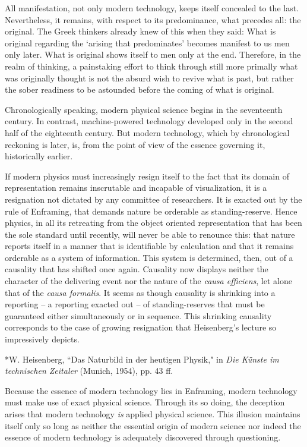 \documentclass[12pt]{article}
\begin{document}
All manifestation, not only modern technology, keeps itself concealed to the last. Nevertheless, it remains, with respect to its predominance, what precedes all: the original. The Greek thinkers already knew of this when they said: What is original regarding the `arising that predominates' becomes manifest to us men only later. What is original shows itself to men only at the end. Therefore, in the realm of thinking, a painstaking effort to think through still more primally what was originally thought is not the absurd wish to revive what is past, but rather the sober readiness to be astounded before the coming of what is original.

Chronologically speaking, modern physical science begins in the seventeenth century. In contrast, machine-powered technology developed only in the second half of the eighteenth century. But modern technology, which by chronological reckoning is later, is, from the point of view of the essence governing it, historically earlier.

If modern physics must increasingly resign itself to the fact that its domain of representation remains inscrutable and incapable of visualization, it is a resignation not dictated by any committee of researchers. It is exacted out by the rule of Enframing, that demands nature be orderable as standing-reserve. Hence physics, in all its retreating from the object oriented representation that has been the sole standard until recently, will never be able to renounce this: that nature reports itself in a manner that is identifiable by calculation and that it remains orderable as a system of information. This system is determined, then, out of a causality that has shifted once again. Causality now displays neither the character of the delivering event nor the nature of the \textit{causa efficiens}, let alone that of the \textit{causa formalis}. It seems as though causality is shrinking into a reporting -- a reporting exacted out -- of standing-reserves that must be guaranteed either simultaneously or in sequence.  This shrinking causality corresponds to the case of growing resignation that Heisenberg's lecture so impressively depicts.

*W. Heisenberg, ``Das Naturbild in der heutigen Physik," in \textit{Die K{\"u}nste im technischen Zeitaler} (Munich, 1954), pp. 43 ff.

Because the essence of modern technology lies in Enframing, modern technology must make use of exact physical science. Through its so doing, the deception arises that modern technology \textit{is} applied physical science. This illusion maintains itself only so long as neither the essential origin of modern science nor indeed the essence of modern technology is adequately discovered through questioning.
\end{document}
